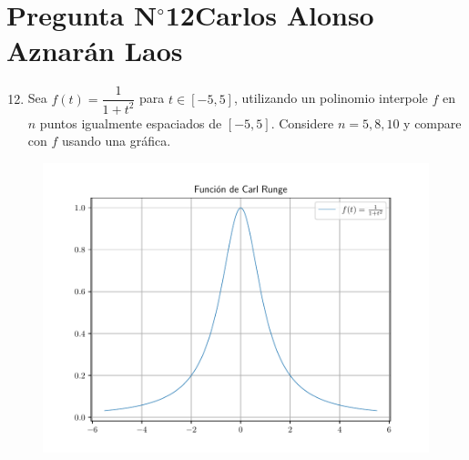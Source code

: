 \section{Pregunta N$^{\circ}$12\qquad Carlos Alonso Aznarán Laos}

\begin{frame}
    \begin{enumerate}\setcounter{enumi}{11}
        \item

              Sea
              \begin{math}
                  f\left(t\right)=
                  \dfrac{1}{1+t^{2}}
              \end{math}
              para $t\in\left[-5,5\right]$, utilizando un polinomio
              interpole $f$ en $n$ puntos igualmente espaciados de
              $\left[-5,5\right]$.
              Considere $n=5,8,10$ y compare con $f$ usando una
              gráfica.
    \end{enumerate}

    \begin{solution}
        \begin{figure}[ht!]
            \centering
            \includegraphics[width=.7\paperwidth]{p12}
        \end{figure}
    \end{solution}
\end{frame}

